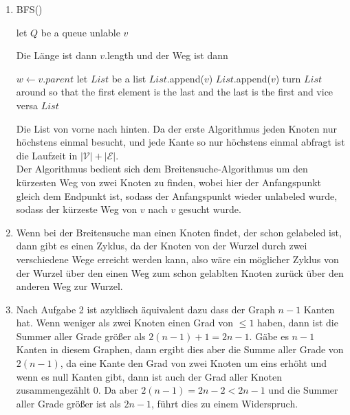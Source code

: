 \documentclass[11pt]{scrartcl}
\begin{document}
\begin{enumerate}[label=(\alph*)]
	\item 
		\begin{algorithm}
			\caption{BFS()}
			let $ Q $ be a queue\;
			unlable $ v $ 
		\end{algorithm}
		Die Länge ist dann $ v $.length und der Weg ist dann 
		\begin{algorithm}
			$ w \leftarrow v.parent $\;
			let $ List $ be a list\;
			$ List $.append($ v $)\;
			\While{$ w $ is not $ v $}{
				$ List $.append($ w $)\;
				$ w \leftarrow w.parent $ \;
			}
			$ List $.append($ v $)\;
			turn $ List $ around so that the first element is the last and the last is the first and vice versa\;
			\Return $ List $\;
		\end{algorithm}
		Die List von vorne nach hinten.
		Da der erste Algorithmus jeden Knoten nur höchstens einmal besucht, und jede Kante so nur höchstens einmal abfragt ist die Laufzeit in $ \mathcal{\left| V \right| + \left| E \right| }  $.\\
		Der Algorithmus bedient sich dem Breitensuche-Algorithmus um den kürzesten Weg von zwei Knoten zu finden, wobei hier der Anfangspunkt gleich dem Endpunkt ist, sodass der Anfangspunkt wieder unlabeled wurde, sodass der kürzeste Weg von $ v $ nach $ v $ gesucht wurde.
	\item Wenn bei der Breitensuche man einen Knoten findet, der schon gelabeled ist, dann gibt es einen Zyklus, da der Knoten von der Wurzel durch zwei verschiedene Wege erreicht werden kann, also wäre ein möglicher Zyklus von der Wurzel über den einen Weg zum schon gelablten Knoten zurück über den anderen Weg zur Wurzel.
	\item Nach Aufgabe 2 ist azyklisch äquivalent dazu dass der Graph $ n - 1 $ Kanten hat.
		Wenn weniger als zwei Knoten einen Grad von $ \leq 1 $ haben, dann ist die Summer aller Grade größer als $ 2(n-1) + 1 = 2n - 1 $.
		Gäbe es $ n - 1 $ Kanten in diesem Graphen, dann ergibt dies aber die Summe aller Grade von $ 2(n - 1) $, da eine Kante den Grad von zwei Knoten um eins erhöht und wenn es null Kanten gibt, dann ist auch der Grad aller Knoten zusammengezählt 0. Da aber $ 2(n - 1) = 2n - 2 < 2n - 1 $ und die Summer aller Grade größer ist als $ 2n - 1 $, führt dies zu einem Widerspruch.
\end{enumerate}
\end{document}
